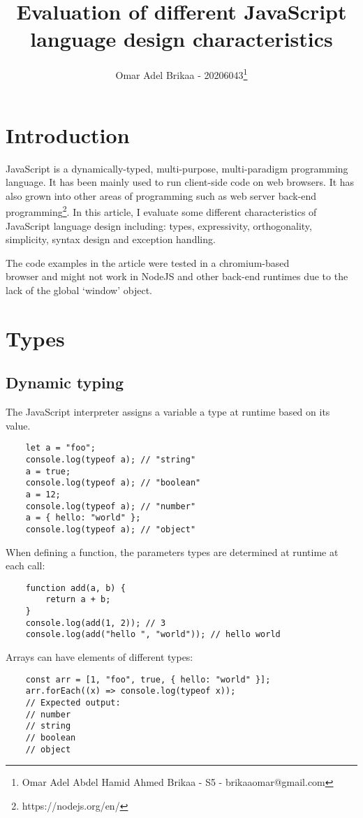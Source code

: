 \documentclass[11pt,a4paper]{article}
\begin{document}
\title{Evaluation of different JavaScript language design characteristics}
\author{Omar Adel Brikaa - 20206043\thanks{Omar Adel Abdel Hamid Ahmed Brikaa - S5 - brikaaomar@gmail.com}}
\date{}
\maketitle

\tableofcontents

\section{Introduction}
JavaScript is a dynamically-typed, multi-purpose, multi-paradigm programming language.
It has been mainly used to run client-side code on web browsers.
It has also grown into other areas of programming such as web server back-end programming\footnote{https://nodejs.org/en/}.
In this article, I evaluate some different characteristics of JavaScript language design including:
types, expressivity, orthogonality, simplicity, syntax design and exception handling.

The code examples in the article were tested in a chromium-based\\browser and might not work in NodeJS and other back-end
runtimes due to the lack of the global `window' object.

\section{Types}

\subsection{\label{dynamic_typing}Dynamic typing}
The JavaScript interpreter assigns a variable a type at runtime based on its value.
\begin{verbatim}
    let a = "foo";
    console.log(typeof a); // "string"
    a = true;
    console.log(typeof a); // "boolean"
    a = 12;
    console.log(typeof a); // "number"
    a = { hello: "world" };
    console.log(typeof a); // "object"
\end{verbatim}
When defining a function, the parameters types are determined at runtime at each call:
\begin{verbatim}
    function add(a, b) {
        return a + b;
    }
    console.log(add(1, 2)); // 3
    console.log(add("hello ", "world")); // hello world
\end{verbatim}
Arrays can have elements of different types:
\begin{verbatim}
    const arr = [1, "foo", true, { hello: "world" }];
    arr.forEach((x) => console.log(typeof x));
    // Expected output:
    // number
    // string
    // boolean
    // object
\end{verbatim}
\end{document}
